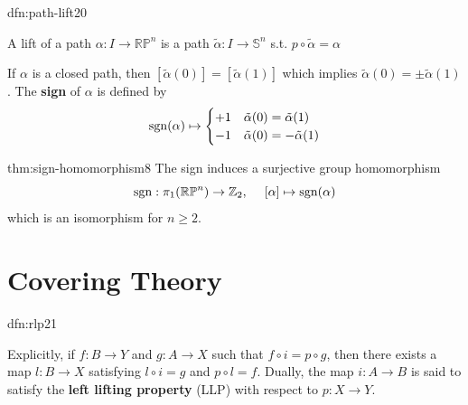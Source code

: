 \documentclass[landscape, 8pt]{extarticle}
\begin{document}
\begin{multicols*}{3}
\vspace{-7pt}
\begin{dfn}{dfn:path-lift}{20}
	\begin{itemize-zero}
	    \item A lift of a path $\alpha : I \to \mathbb{RP}^{n}$ is a path $\tilde{\alpha} : I \to \mathbb{S}^{n}$ s.t. $p \circ \tilde{\alpha} = \alpha$
	    \item If $\alpha$ is a closed path, then $[\tilde{\alpha}(0)] = [\tilde{\alpha}(1)]$ which implies $\tilde{\alpha}(0) = \pm \tilde{\alpha}(1)$. The \textbf{sign} of $\alpha$ is defined by
			\[\operatorname{sgn}(\alpha) \mapsto \begin{cases}
				+1 & \tilde{\alpha}(0) = \tilde{\alpha}(1) \\
				-1 & \tilde{\alpha}(0) = -\tilde{\alpha}(1)
			\end{cases}\]
	\end{itemize-zero}

\end{dfn}

\vspace{-7pt}
\begin{thm}{thm:sign-homomorphism}{8}
	\vspace{-2pt}
	The sign induces a surjective group homomorphism
	\[\operatorname{sgn} : \pi_{1}(\mathbb{RP}^{n}) \to \mathbb{Z}_{2},\;\quad [\alpha] \mapsto \operatorname{sgn}(\alpha)\]
	which is an isomorphism for $n \ge 2$.
\end{thm}

\section{Covering Theory}
\vspace{-3pt}
\begin{dfn}{dfn:rlp}{21}
	\vspace{-2pt}
	{
	}
Explicitly, if $f : B \to Y$ and $g : A \to X$ such that $f \circ i = p \circ g$, then there exists a map $l : B \to X$ satisfying $l \circ i = g$ and $p \circ l = f$. Dually, the map $i : A \to B$ is said to satisfy the \textbf{left lifting property} (LLP) with respect to $p : X \to Y$.
\end{dfn}


\end{multicols*}
\end{document}
